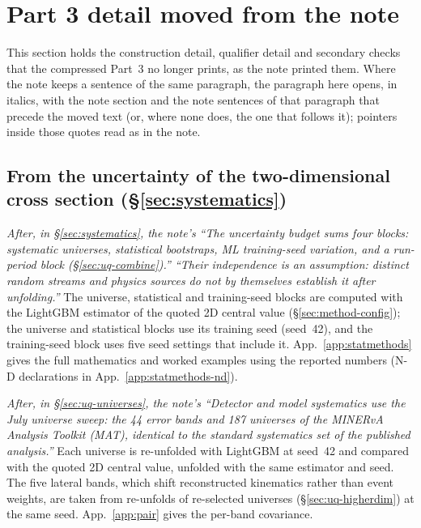 \section{Part 3 detail moved from the note}
This section holds the construction detail, qualifier detail and secondary checks that the compressed Part~3 no longer prints, as the note printed them. Where the note keeps a sentence of the same paragraph, the paragraph here opens, in italics, with the note section and the note sentences of that paragraph that precede the moved text (or, where none does, the one that follows it); pointers inside those quotes read as in the note.

\subsection{From the uncertainty of the two-dimensional cross section (\S\ref{sec:systematics})}
\emph{After, in \S\ref{sec:systematics}, the note's ``The uncertainty budget sums four blocks: systematic universes, statistical bootstraps, ML training-seed variation, and a run-period block (\S\ref{sec:uq-combine}).'' ``Their independence is an assumption: distinct random streams and physics sources do not by themselves establish it after unfolding.''}
The universe, statistical and training-seed blocks are computed with the LightGBM estimator of the quoted 2D central value (\S\ref{sec:method-config}); the universe and statistical blocks use its training seed (seed~42), and the training-seed block uses five seed settings that include it. App.~\ref{app:statmethods} gives the full mathematics and worked examples using the reported numbers (N-D declarations in App.~\ref{app:statmethods-nd}).

\emph{After, in \S\ref{sec:uq-universes}, the note's ``Detector and model systematics use the July universe sweep: the 44 error bands and 187 universes of the MINERvA Analysis Toolkit (MAT), identical to the standard systematics set of the published analysis.''}
Each universe is re-unfolded with LightGBM at seed~42 and compared with the quoted 2D central value, unfolded with the same estimator and seed. The five lateral bands, which shift reconstructed kinematics rather than event weights, are taken from re-unfolds of re-selected universes (\S\ref{sec:uq-higherdim}) at the same seed. App.~\ref{app:pair} gives the per-band covariance.


